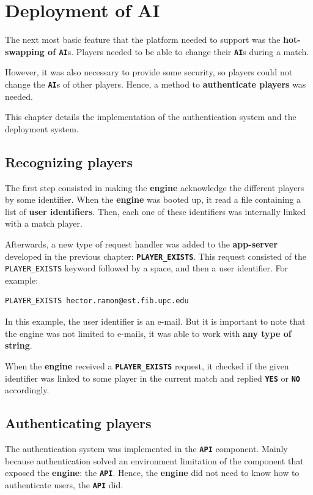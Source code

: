 \documentclass[a4paper,11pt,titlepage,abstract,numbers=noenddot,automark,mnsy,intlimits,rgb,dvipsnames]{report}
\begin{document}
\chapter{Deployment of AI}
\label{deployment_ai}
The next most basic feature that the platform needed to support was the \textbf{hot-swapping of \texttt{AI}}s. Players needed to be
able to change their \textbf{\texttt{AI}}s during a match.

However, it was also necessary to provide some security, so players could not change the \textbf{\texttt{AI}}s of other players. Hence,
a method to \textbf{authenticate players} was needed.

This chapter details the implementation of the authentication system and the deployment system.
\section{Recognizing players}
The first step consisted in making the \textbf{engine} acknowledge the different players by some identifier. When the \textbf{engine}
was booted up, it read a file containing a list of \textbf{user identifiers}. Then, each one of these identifiers was internally
linked with a match player.

Afterwards, a new type of request handler was added to the \textbf{app-server} developed in the previous chapter: \textbf{\texttt{PLAYER\_EXISTS}}.
This request consisted of the \texttt{PLAYER\_EXISTS} keyword followed by a space, and then a user identifier. For example:
\begin{verbatim}
PLAYER_EXISTS hector.ramon@est.fib.upc.edu
\end{verbatim}
In this example, the user identifier is an e-mail. But it is important to note that the engine was not limited to e-mails,
it was able to work with \textbf{any type of string}.

When the \textbf{engine} received a \textbf{\texttt{PLAYER\_EXISTS}} request, it checked if the given identifier was linked to some player in
the current match and replied \textbf{\texttt{YES}} or \textbf{\texttt{NO}} accordingly.
\section{Authenticating players}
The authentication system was implemented in the \textbf{\texttt{API}} component. Mainly because authentication solved an environment
limitation of the component that exposed the \textbf{engine}: the \textbf{\texttt{API}}. Hence, the \textbf{engine} did not need to know how to authenticate
users, the \textbf{\texttt{API}} did.
\end{document}
